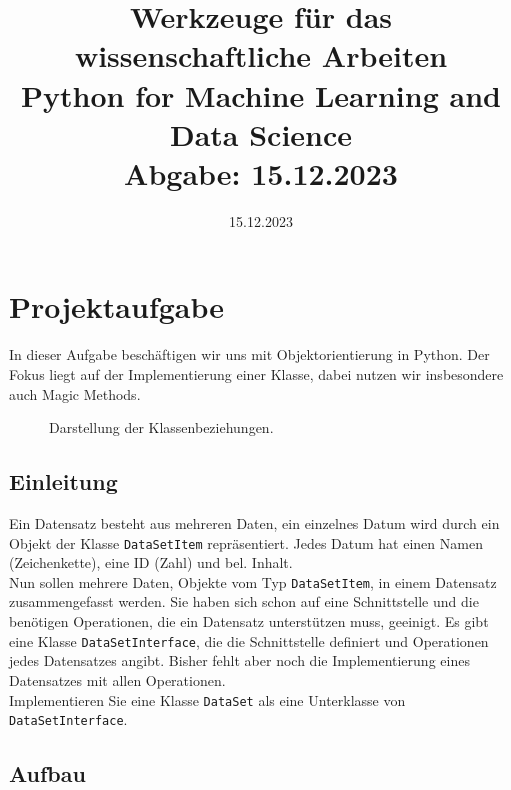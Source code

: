 \documentclass[]{article}
\begin{document}
\title{Werkzeuge für das wissenschaftliche Arbeiten \\ Python for Machine Learning and Data Science \\ Abgabe: 15.12.2023}
\date{15.12.2023}
\maketitle

\tableofcontents

\newpage

\section{Projektaufgabe}

In dieser Aufgabe beschäftigen wir uns mit Objektorientierung in Python.
Der Fokus liegt auf der Implementierung einer Klasse, dabei nutzen wir insbesondere auch Magic Methods.
\begin{figure}[t!]
    \centerline{}
    \caption{Darstellung der Klassenbeziehungen.}
    \label{fig: Darstellung Klassenbezeichnung}
\end{figure}

    \subsection{Einleitung}
    
Ein Datensatz besteht aus mehreren Daten, ein einzelnes Datum wird durch ein Objekt der Klasse \texttt{DataSetItem} repräsentiert.
Jedes Datum hat einen Namen (Zeichenkette), eine ID (Zahl) und bel. Inhalt. \\
\newline
Nun sollen mehrere Daten, Objekte vom Typ \texttt{DataSetItem}, in einem Datensatz zusammengefasst werden.
Sie haben sich schon auf eine Schnittstelle und die benötigen Operationen, die ein Datensatz unterstützen muss, geeinigt.
Es gibt eine Klasse \texttt{DataSetInterface}, die die Schnittstelle definiert und Operationen jedes Datensatzes angibt.
Bisher fehlt aber noch die Implementierung eines Datensatzes mit allen Operationen.\\
\newline
Implementieren Sie eine Klasse \texttt{DataSet} als eine Unterklasse von \texttt{DataSetInterface}.

    \subsection{Aufbau}
    
\end{document}
